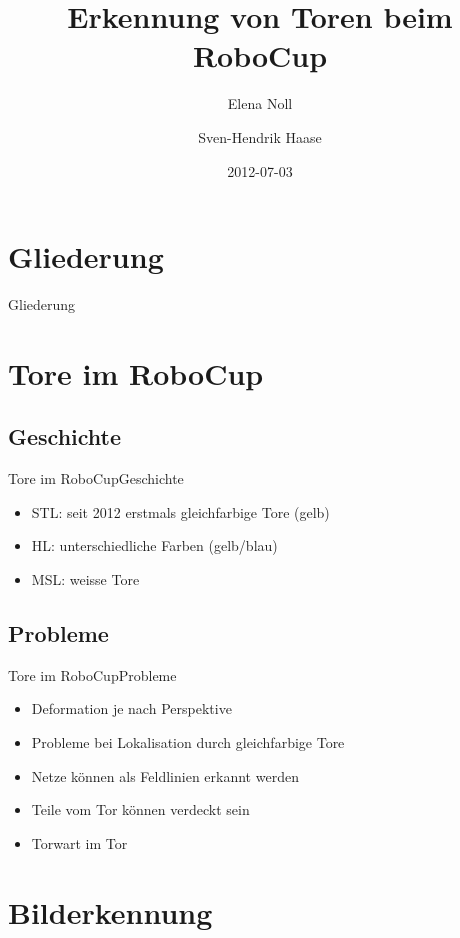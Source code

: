 \documentclass{beamer}
\begin{document}
\title{Erkennung von Toren beim RoboCup}
\date{2012-07-03}
\author{Elena Noll \and Sven-Hendrik Haase}

\begin{frame}
    \titlepage
\end{frame}

\section*{Gliederung}
\begin{frame}{Gliederung}
    \tableofcontents
\end{frame}

\section{Tore im RoboCup}
\subsection{Geschichte}
\begin{frame}{Tore im RoboCup}{Geschichte}
\begin{itemize}
    \item STL: seit 2012 erstmals gleichfarbige Tore (gelb)
    \item HL: unterschiedliche Farben (gelb/blau)
    \item MSL: weisse Tore
\end{itemize}
\end{frame}

\subsection{Probleme}
\begin{frame}{Tore im RoboCup}{Probleme}
\begin{itemize}
    \item Deformation je nach Perspektive
    \item Probleme bei Lokalisation durch gleichfarbige Tore
    \item Netze können als Feldlinien erkannt werden
    \item Teile vom Tor können verdeckt sein
    \item Torwart im Tor
\end{itemize}
\end{frame}

\section{Bilderkennung}
\end{document}
